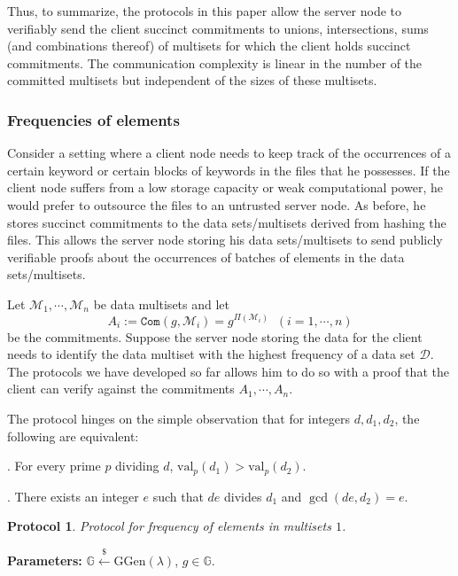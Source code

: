 \documentclass[11pt, lettersize, notitlepage, leqno, footskip=0.6cm]{article}
\newcommand{\ttt}{\texttt}
\newcommand{\mc}{\mathcal}
\newcommand{\mb}{\mathbb}
\newcommand{\mr}{\mathrm}
\newcommand{\lamb}{\lambda}
\newcommand{\vs}{\vspace{-0.15cm}}
\newcommand{\noin}{\noindent}
\newtheorem{Prot}[Thm]{Protocol}
\numberwithin{equation}{section}
\begin{document}
\bigskip

Thus, to summarize, the protocols in this paper allow the server node to verifiably send the client succinct commitments to unions, intersections, sums (and combinations thereof) of multisets for which the client holds succinct commitments.  The communication complexity is linear in the number of the committed multisets but independent of the sizes of these multisets.

\subsubsection{\fontsize{11}{11} Frequencies of elements}

Consider a setting where a client node needs to keep track of the occurrences of a certain keyword or certain blocks of keywords in the files that he possesses. If the client node suffers from a low storage capacity or weak computational power, he would prefer to outsource the files to an untrusted server node. As before, he stores succinct commitments to the data sets/multisets derived from hashing the files. This allows the server node storing his data sets/multisets to send publicly verifiable proofs about the occurrences of batches of elements in the data sets/multisets.

Let $\mc{M}_1,\cdots, \mc{M}_n$ be data multisets and let \vs $$A_i:= \ttt{Com}(g,\mc{M}_i) = g^{\Pi(\mc{M}_i)}\;\;(i=1,\cdots,n) $$ be the commitments. Suppose the server node storing the data for the client needs to identify the data multiset with the highest frequency of a data set $\mc{D}$. The protocols we have developed so far allows him to do so with a proof that the client can verify against the commitments $A_1,\cdots,A_n$.

The protocol hinges on the simple observation that for integers $d,d_1,d_2$, the following are equivalent:

\noin 1. For every prime $p$ dividing $d$, $\mr{val}_p(d_1) > \mr{val}_p(d_2).$

\noin 2. There exists an integer $e$ such that $de$ divides $d_1$ and $\gcd(de, d_2) = e$.

\vspace{0.1cm}

\begin{Prot} Protocol for frequency of elements in multisets $1$.\end{Prot} \vspace{-0.3cm}

\noin \textbf{Parameters:} $\mb{G}\xleftarrow{\$} \mr{GGen}(\lamb)$,\; $g\in \mb{G}$.
\end{document}
